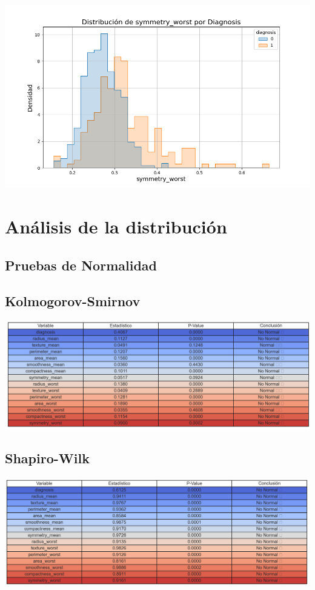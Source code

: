 \documentclass[a4paper, 12pt]{article}
\begin{document}
\includegraphics[width=\textwidth]{../Plots/plots_diagnosis/distribucion_symmetry_worst_por_diagnosis.png}


\newpage

\section{Análisis de la distribución}

\subsection{Pruebas de Normalidad}

\subsection*{Kolmogorov-Smirnov}
\includegraphics[width=\textwidth]{../Plots/resumen_normalidad.png}

\subsection*{Shapiro-Wilk}
\includegraphics[width=\textwidth]{../Plots/resumen_shapiro_wilk.png}
\end{document}
